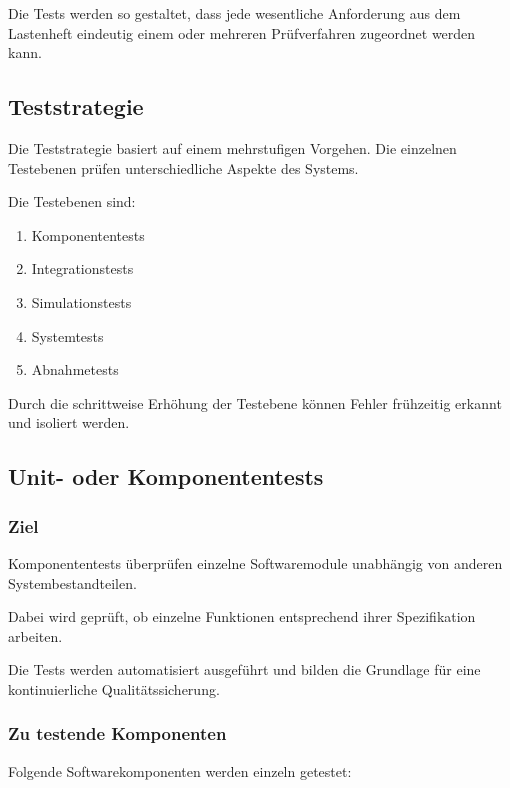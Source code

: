 Die Tests werden so gestaltet, dass jede wesentliche Anforderung aus dem
Lastenheft eindeutig einem oder mehreren Prüfverfahren zugeordnet werden
kann.

\subsection{Teststrategie}\label{teststrategie}

Die Teststrategie basiert auf einem mehrstufigen Vorgehen. Die einzelnen
Testebenen prüfen unterschiedliche Aspekte des Systems.

Die Testebenen sind:

\begin{enumerate}
\def\labelenumi{\arabic{enumi}.}
\tightlist
\item
  Komponententests
\item
  Integrationstests
\item
  Simulationstests
\item
  Systemtests
\item
  Abnahmetests
\end{enumerate}

Durch die schrittweise Erhöhung der Testebene können Fehler frühzeitig
erkannt und isoliert werden.

\subsection{Unit- oder
Komponententests}\label{unit--oder-komponententests}

\subsubsection{Ziel}\label{ziel}

Komponententests überprüfen einzelne Softwaremodule unabhängig von
anderen Systembestandteilen.

Dabei wird geprüft, ob einzelne Funktionen entsprechend ihrer
Spezifikation arbeiten.

Die Tests werden automatisiert ausgeführt und bilden die Grundlage für
eine kontinuierliche Qualitätssicherung.

\subsubsection{Zu testende Komponenten}\label{zu-testende-komponenten}

Folgende Softwarekomponenten werden einzeln getestet:

